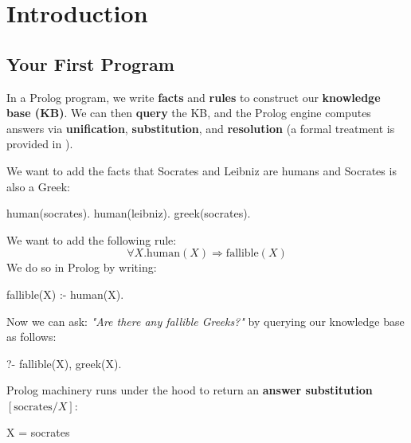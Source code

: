 \section{Introduction}
\subsection{Your First Program}

In a Prolog program, we write \textbf{facts} and \textbf{rules} to construct our \textbf{knowledge base (KB)}. We can then \textbf{query} the KB, and the Prolog engine computes answers via \textbf{unification}, \textbf{substitution}, and \textbf{resolution} (a formal treatment is provided in ).

\begin{example}[Facts]{}
We want to add the facts that Socrates and Leibniz are humans and Socrates is also a Greek:
\begin{codeblock}
human(socrates).
human(leibniz).
greek(socrates).
\end{codeblock}    
\end{example}


\begin{example}[Rules]{}
We want to add the following rule: 
\[
\forall X. \text{human}(X) \Rightarrow \text{fallible}(X)
\]
We do so in Prolog by writing:
\begin{codeblock}
fallible(X) :-
    human(X).
\end{codeblock}
\end{example}

\begin{example}[Query]{}
Now we can ask: \textit{"Are there any fallible Greeks?"} by querying our knowledge base as follows:
\begin{codeblock}
?- fallible(X), greek(X).
\end{codeblock}
Prolog machinery runs under the hood to return an \textbf{answer substitution} $[\text{socrates}/X]$:
\begin{codeblock}
X = socrates
\end{codeblock}
\end{example}

